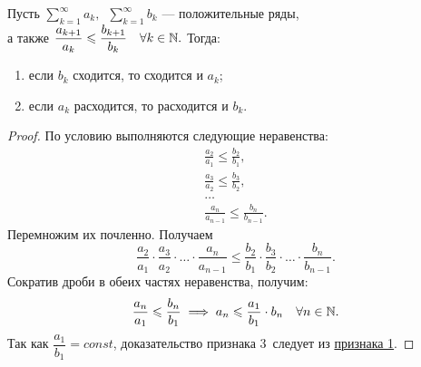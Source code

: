 \documentclass[../../main.tex]{subfiles}
\begin{document}
\begin{thm}
 	\label{lec26:comp_test_3}
 	Пусть $\sum\limits_{k = 1}^\infty a_k,\enspace \sum\limits_{k = 1}^\infty 
 	b_k$
 	 --- положительные ряды,\\ 
 	а также $\displaystyle\frac{a_{k+1}}{a_k} \leqslant \frac{b_{k+1}}{b_k} \quad
 	\forall k \in \mathbb{N}.$ Тогда:
	\begin{enumerate}[label={\alph*)}]
	\item если  $b_k$ сходится, то сходится и $a_k$;
	\item если $a_k$ расходится, то расходится и $b_k$.
	\end{enumerate}
\end{thm}
\begin{proof}
	По условию выполняются следующие неравенства:
 	\begin{gather*}
			\frac{a_2}{a_1} \leq \frac{b_2}{b_1}, \\
			\frac{a_3}{a_2} \leq \frac{b_3}{b_2}, \\
			\dots\\
			\frac{a_n}{a_{n-1}} \leq \frac{b_n}{b_{n-1}}.
	\end{gather*}
	Перемножим их почленно. Получаем
	\[
		\frac{a_2}{a_1}\cdot\frac{a_3}{a_2}\cdot\ldots
		\cdot\frac{a_n}{a_{n-1}} \leq
		\frac{b_2}{b_1}\cdot\frac{b_3}{b_2}\cdot\ldots
		\cdot\frac{b_n}{b_{n-1}}
	.\]
	Сократив дроби в обеих частях неравенства, получим:
	\[
		\frac{a_n}{a_1} \leqslant \frac{b_n}{b_1} \implies
		a_n \leqslant \frac{a_1}{b_1}\cdot b_n\quad \forall n \in \mathbb{N}
	.\]
	Так как $\dfrac{a_1}{b_1} = const$, 
	доказательство признака 3\textdegree \ следует из
	\hyperref[lec26:comp_test_1]{признака  1\textdegree}.
\end{proof}
\end{document}
